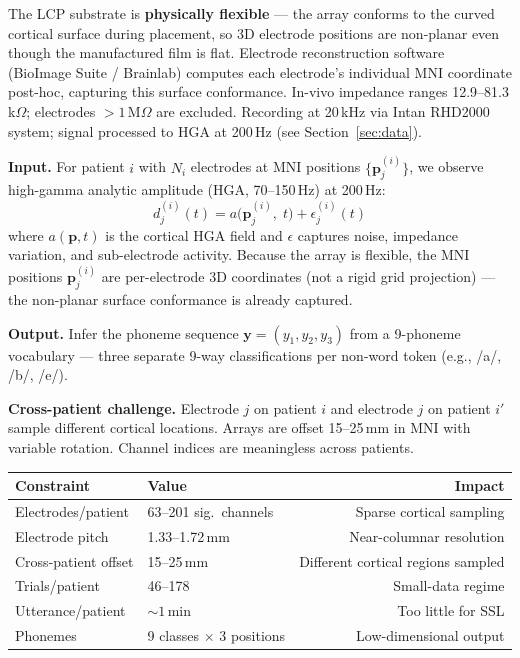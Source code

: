 \documentclass[11pt,letterpaper]{article}
\newcommand{\bfp}{\mathbf{p}}
\newcommand{\bfy}{\mathbf{y}}
\begin{document}
\noindent The LCP substrate is \textbf{physically flexible} --- the array conforms to the curved cortical surface during placement, so 3D electrode positions are non-planar even though the manufactured film is flat. Electrode reconstruction software (BioImage Suite / Brainlab) computes each electrode's individual MNI coordinate post-hoc, capturing this surface conformance. In-vivo impedance ranges 12.9--81.3\,k$\Omega$; electrodes $> 1$\,M$\Omega$ are excluded. Recording at 20\,kHz via Intan RHD2000 system; signal processed to HGA at 200\,Hz (see Section~\ref{sec:data}).

\textbf{Input.} For patient $i$ with $N_i$ electrodes at MNI positions $\{\bfp_j^{(i)}\}$, we observe high-gamma analytic amplitude (HGA, 70--150\,Hz) at 200\,Hz:
\begin{equation}\label{eq:observation}
d_j^{(i)}(t) = a\bigl(\bfp_j^{(i)},\; t\bigr) + \epsilon_j^{(i)}(t)
\end{equation}
where $a(\bfp, t)$ is the cortical HGA field and $\epsilon$ captures noise, impedance variation, and sub-electrode activity. Because the array is flexible, the MNI positions $\bfp_j^{(i)}$ are per-electrode 3D coordinates (not a rigid grid projection) --- the non-planar surface conformance is already captured.

\textbf{Output.} Infer the phoneme sequence $\bfy = (y_1, y_2, y_3)$ from a 9-phoneme vocabulary --- three separate 9-way classifications per non-word token (e.g., /a/, /b/, /e/).

\textbf{Cross-patient challenge.} Electrode $j$ on patient $i$ and electrode $j$ on patient $i'$ sample different cortical locations. Arrays are offset 15--25\,mm in MNI with variable rotation. Channel indices are meaningless across patients.

\begin{table}[ht!]
\centering\small
\begin{tabular}{@{}llr@{}}
\toprule
\textbf{Constraint} & \textbf{Value} & \textbf{Impact} \\
\midrule
Electrodes/patient & 63--201 sig.\ channels & Sparse cortical sampling \\
Electrode pitch & 1.33--1.72\,mm & Near-columnar resolution \\
Cross-patient offset & 15--25\,mm & Different cortical regions sampled \\
Trials/patient & 46--178 & Small-data regime \\
Utterance/patient & ${\sim}1$\,min & Too little for SSL \\
Phonemes & 9 classes $\times$ 3 positions & Low-dimensional output \\
\bottomrule
\end{tabular}
\end{table}
\end{document}
